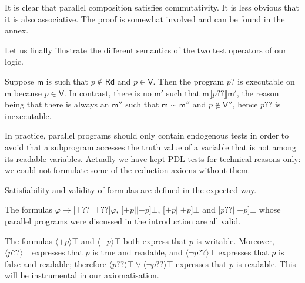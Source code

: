 \documentclass{llncs}
\newcommand{\modl}{\mathsf m}
\newcommand{\pll}{ {||} }							%
\newcommand{\readset}{\mathsf{Rd}}
\newcommand{\valuset}{\mathsf{V}}
\newcommand{\testendo}{?\!\!?}			%
\newcommand{\testpdl}{?}				%
\newcommand{\ah}[1]{\**\marginpar{\textbf{AH:} #1}}
\newcommand{\assgntopV}[1]{{\mathtt {+} #1}}
\newcommand{\assgnbotV}[1]{{\mathtt {-} #1}}
\newcommand{\intPgm}[1]{\llbracket #1 \rrbracket}
\newcommand{\lbox}[1]{ \big[ #1 \big] }
\newcommand{\ldia}[1]{ \big\langle #1 \big\rangle}
\newcommand{\limp}{ \rightarrow }
\newcommand{\ndet}{\,{\cup}\,}
\renewcommand{\phi}{\varphi}
\begin{document}
\ah{
paragraphe ajoute
}
It is clear that parallel composition satisfies commutativity. 
It is less obvious that it is also associative. 
The proof is somewhat involved and can be found in the annex. 

Let us finally illustrate the different semantics of the two test operators of our logic.

\begin{example}
Suppose $\modl$ is such that $p \notin \readset$ and $p \in \valuset$. 
Then the program $p \testpdl$ is executable on $\modl$ because $p \in \valuset$.
In contrast, there is no $\modl'$ such that $\modl \intPgm{ p \testendo } \modl'$, 
the reason being that there is always an $\modl''$ such that $\modl \sim \modl''$ and $p \notin \valuset''$,
hence $p \testendo$ is inexecutable. %
\end{example}

In practice, parallel programs should only contain endogenous tests in order to avoid that a subprogram accesses the truth value of a variable that is not among its readable variables.
Actually we have kept PDL tests for technical reasons only:
we could not formulate some of the reduction axioms without them. 

Satisfiability and validity of formulas are defined in the expected way.

\begin{example}
The formulas 
$\phi \limp \lbox{ \top \testendo \pll \top \testendo } \phi$, 
$\lbox{ \assgntopV p \pll \assgnbotV p } \bot$,
$\lbox{ \assgntopV p \pll \assgntopV p } \bot$ and 
$\lbox{ p \testendo \pll \assgntopV p } \bot$ 
whose parallel programs were discussed in the introduction are all valid. 
\end{example}

The formulas $\ldia{ \assgntopV p } \top $ and $\ldia{ \assgnbotV p } \top $ both express that $p$ is writable. 
Moreover, $\ldia{ p \testendo} \top $ expresses that $p$ is true and readable, and 
$\ldia{ \lnot p \testendo} \top $ expresses that $p$ is false and readable;
therefore $\ldia{ p \testendo} \top \lor \ldia{ \lnot p \testendo} \top $ 
expresses that $p$ is readable. 
This will be instrumental in our axiomatisation. 
\end{document}
